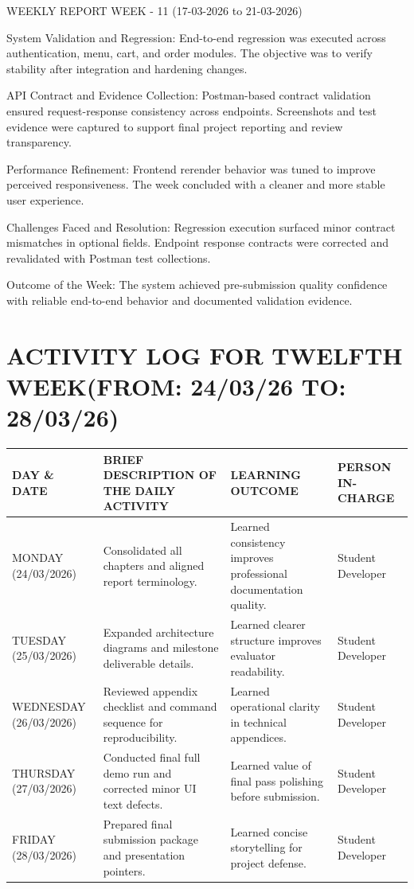 \documentclass[12pt,a4paper]{report}
\begin{document}
WEEKLY REPORT
WEEK - 11 (17-03-2026 to 21-03-2026)

System Validation and Regression:
End-to-end regression was executed across authentication, menu, cart, and order modules. The objective was to verify stability after integration and hardening changes.

API Contract and Evidence Collection:
Postman-based contract validation ensured request-response consistency across endpoints. Screenshots and test evidence were captured to support final project reporting and review transparency.

Performance Refinement:
Frontend rerender behavior was tuned to improve perceived responsiveness. The week concluded with a cleaner and more stable user experience.

Challenges Faced and Resolution:
Regression execution surfaced minor contract mismatches in optional fields. Endpoint response contracts were corrected and revalidated with Postman test collections.

Outcome of the Week:
The system achieved pre-submission quality confidence with reliable end-to-end behavior and documented validation evidence.

\section*{ACTIVITY LOG FOR TWELFTH WEEK(FROM: 24/03/26 TO: 28/03/26)}
\begin{longtable}{|p{2.2cm}|p{5.2cm}|p{4.3cm}|p{3.2cm}|}
\hline
\textbf{DAY \& DATE} & \textbf{BRIEF DESCRIPTION OF THE DAILY ACTIVITY} & \textbf{LEARNING OUTCOME} & \textbf{PERSON IN- CHARGE} \\
\hline
MONDAY (24/03/2026) & Consolidated all chapters and aligned report terminology. & Learned consistency improves professional documentation quality. & Student Developer \\
\hline
TUESDAY (25/03/2026) & Expanded architecture diagrams and milestone deliverable details. & Learned clearer structure improves evaluator readability. & Student Developer \\
\hline
WEDNESDAY (26/03/2026) & Reviewed appendix checklist and command sequence for reproducibility. & Learned operational clarity in technical appendices. & Student Developer \\
\hline
THURSDAY (27/03/2026) & Conducted final full demo run and corrected minor UI text defects. & Learned value of final pass polishing before submission. & Student Developer \\
\hline
FRIDAY (28/03/2026) & Prepared final submission package and presentation pointers. & Learned concise storytelling for project defense. & Student Developer \\
\hline
\end{longtable}
\end{document}
